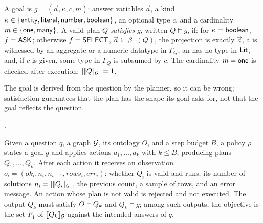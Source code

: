 \begin{definition}[Goal]
\label{def-goal}
A goal is $g = (\vec{a}, \kappa, c, m)$: answer variables
$\vec{a}$, a kind
$\kappa \in \{{\mathsf{entity}}, {\mathsf{literal}}, {\mathsf{number}}, {\mathsf{boolean}}\}$,
an optional type $c$, and a cardinality $m \in \{{\mathsf{one}}, {\mathsf{many}}\}$.
A valid plan $Q$ \emph{satisfies} $g$, written
$Q \models g$, if:
for $\kappa = {\mathsf{boolean}}$, $f = {\mathsf{ASK}}$;
otherwise $f = {\mathsf{SELECT}}$, $\vec{a} \subseteq \beta^+(Q)$, the
projection is exactly $\vec{a}$, a  is witnessed by an
aggregate or a numeric datatype in $\Gamma_Q$, an  has no
type in $\mathsf{Lit}$, and, if $c$ is given, some type in $\Gamma_Q$ is
subsumed by $c$.
The cardinality $m = {\mathsf{one}}$ is checked after execution:
$|[\![ Q ]\!]_{\mathcal{G}}| = 1$.
\end{definition}

The goal is derived from the question by the planner, so it can be
wrong; satisfaction guarantees that the plan has the shape its goal
asks for, not that the goal reflects the question.

.
\begin{definition}
\label{def-problem}
Given a question $q$, a graph $\mathcal{G}$, its ontology $O$, and a step budget
$B$, a policy $\rho$ states a goal $g$ and applies actions
$a_1, \dots, a_k$ with $k \le B$, producing plans
$Q_1, \dots, Q_k$.
After each action it receives an observation
$o_i = (\mathit{ok}_i, n_i, n_{i-1}, \mathit{rows}_i, \mathit{err}_i)$:
whether $Q_i$ is valid and runs, its number of solutions
$n_i = |[\![ Q_i ]\!]_{\mathcal{G}}|$, the previous count, a sample of rows, and
an error message.
An action whose plan is not valid is rejected and not executed.
The output $Q_k$ must satisfy $O \vdash Q_k$ and
$Q_k \models g$; among such outputs, the objective is the set
$F_1$ of $[\![ Q_k ]\!]_{\mathcal{G}}$ against the intended answers of $q$.
\end{definition}

